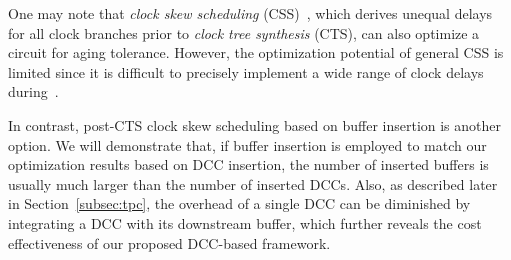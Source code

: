 \begin{comment}
Apparently, the required $T_c$ is further reduced/optimized from 108.5 to 104 (dominated by \ce{L_{YZ}} rather than \ce{L_{XY}} in the first example), by inserting two DCCs and one HTV leader in the existing synthesized clock network. Note that, there exists a difference between DCC and HTV leader. DCC is a physical gate; however, HTV leader is conceptually an imaginary location, from which we begin manipulating the technology of clock buffers toward flip-flops. As it can be seen, when the two approaches, V\textsubscript{th} assignment and aging manipulation  (by DCC insertion) , are applied together in the second example, the skew for \ce{L_{XY}}, which equals 1.28$C_Y$ minus 1.09$C_X$, is larger than that in the first example. Therefore, the new skew for \ce{L_{XY}} is more useful/beneficial and accounts for the better optimization of required $T_c$. 
Additionally, when it comes to the timing-borrowing mechanism of the two examples, there exists a difference: 1) The timing-borrowing mechanism, in the first example, is achieved by the aging-induced clock skew, caused by manipulating the duty-cycle delivered to flip-flops. 2) In the second example, the timing-borrowing mechanism is based on aging-induced clock skew and \textit{tech-induced} clock skew, which is caused by manipulating the technology of clock buffers, i.e., re-assign the V\textsubscript{th} of clock buffers. 
\end{comment}

One may note that \textit{clock skew scheduling} (CSS)~\cite{fishburn1990clock}, which derives unequal delays for all clock branches prior to \textit{clock tree synthesis} (CTS), can also optimize a circuit for aging tolerance. However, the optimization potential of general CSS is limited since it is difficult to precisely implement a wide range of clock delays during~\cite{li2011optimal}.

In contrast, post-CTS clock skew scheduling based on buffer insertion is another option. We will demonstrate that, if buffer insertion is employed to match our optimization results based on DCC insertion, the number of inserted buffers is usually much larger than the number of inserted DCCs. Also, as described later in Section~\ref{subsec:tpc}, the overhead of a single DCC can be diminished by integrating a DCC with its downstream buffer, which further reveals the cost effectiveness of our proposed DCC-based framework.

